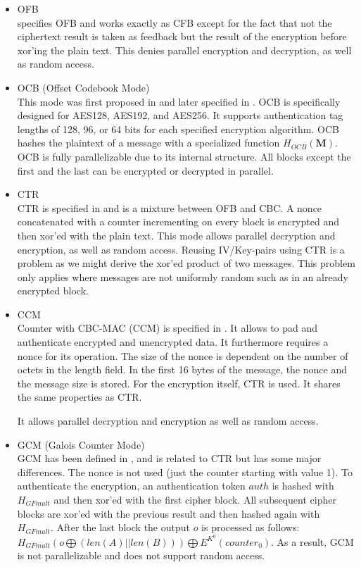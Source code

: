 \begin{itemize}
	\item OFB\\
	\cite{dworkin2001recommendation} specifies OFB and works exactly as CFB except for the fact that not the ciphertext result is taken as feedback but the result of the encryption before xor'ing the plain text. This denies parallel encryption and decryption, as well as random access.
	\item OCB (Offset Codebook Mode)\\
	This mode was first proposed in \cite{rogaway2003ocb} and later specified in \cite{krovetz-ocb-04}. OCB is specifically designed for AES128, AES192, and AES256. It supports authentication tag lengths of 128, 96, or 64 bits for each specified encryption algorithm. OCB hashes the plaintext of a message with a specialized function $H_{OCB}(\mathbf{M})$. OCB is fully parallelizable due to its internal structure. All blocks except the first and the last can be encrypted or decrypted in parallel.
	\item CTR\\
	CTR is specified in \cite{lipmaa2000ctr} and is a mixture between OFB and CBC. A nonce concatenated with a counter incrementing on every block is encrypted and then xor'ed with the plain text. This mode allows parallel decryption and encryption, as well as random access. Reusing IV/Key-pairs using CTR is a problem as we might derive the xor'ed product of two messages. This problem only applies where messages are not uniformly random such as in an already encrypted block.
	\item CCM\\
	Counter with CBC-MAC (CCM) is specified in \cite{RFC3610}. It allows to pad and authenticate encrypted and unencrypted data. It furthermore requires a nonce for its operation. The size of the nonce is dependent on the number of octets in the length field. In the first 16 bytes of the message, the nonce and the message size is stored. For the encryption itself, CTR is used. It shares the same properties as CTR. 
	
	It allows parallel decryption and encryption as well as random access.
	\item GCM (Galois Counter Mode)\\
	GCM has been defined in \cite{mcgrew2004galois}, and is related to CTR but has some major differences. The nonce is not used (just the counter starting with value 1). To authenticate the encryption, an authentication token $auth$ is hashed with $H_{GFmult}$ and then xor'ed with the first cipher block. All subsequent cipher blocks are xor'ed with the previous result and then hashed again with $H_{GFmult}$. After the last block the output $o$ is processed  as follows: $H_{GFmult}(o\bigoplus (len(A)||len(B))) \bigoplus E^{K^0}(counter_0)$. As a result, GCM is not parallelizable and does not support random access.
	

\end{itemize}
